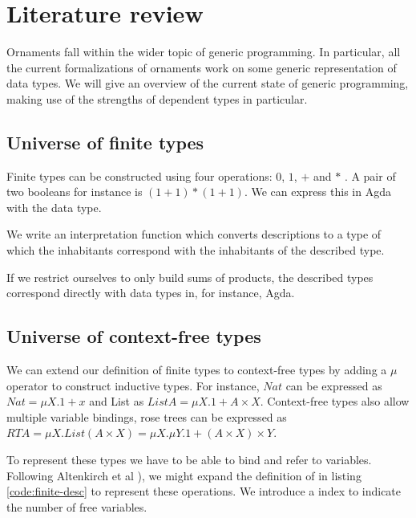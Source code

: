 \section{Literature review}\label{sec:lit}

Ornaments fall within the wider topic of generic programming.
In particular, all the current formalizations of ornaments work on
some generic representation of data types.
We will give an overview of the current state of generic programming,
making use of the strengths of dependent types in particular.

\subsection{Universe of finite types}

Finite types can be constructed using four operations: $0$, $1$, $+$ and
$*$ \cite{altenkirch06}.
A pair of two booleans for instance is $(1 + 1) * (1 + 1)$.
We can express this in Agda with the  data type.


We write an interpretation function which converts descriptions to a
type of which the inhabitants correspond with the inhabitants of the
described type.


If we restrict ourselves to only build sums of products, the described
types correspond directly with data types in, for instance, Agda.

\subsection{Universe of context-free types}

We can extend our definition of finite types to context-free types by
adding a $μ$ operator to construct inductive types.
For instance, $Nat$ can be expressed as $Nat = μX. 1 + x$ and List as $List
A = μX. 1 + A × X$.
Context-free types also allow multiple variable bindings, rose trees
can be expressed as $RT A = μX. List (A × X) = μX. μY. 1 + (A × X) × Y$.

To represent these types we have to be able to bind and refer to
variables.
Following Altenkirch et al \cite{altenkirch06}), we might expand the
definition of  in listing \ref{code:finite-desc} to represent
these operations.
We introduce a  index to indicate the number of free variables.



